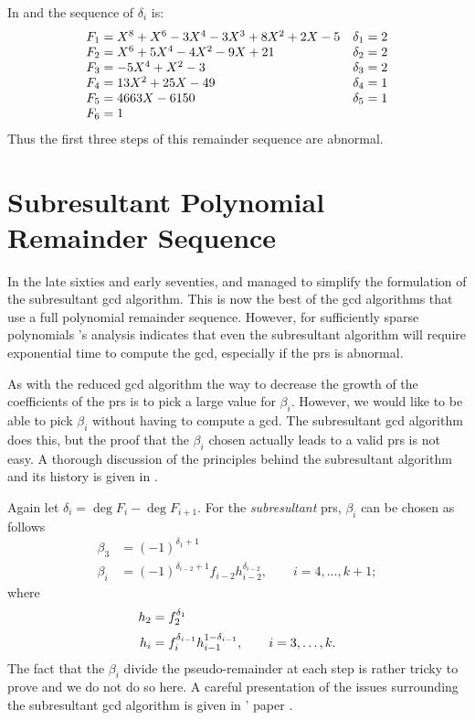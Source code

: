 In  and  the sequence of
$\delta_{i}$ is:
\[
\begin{array}[15pt]{lr}
  F_{1} = X^{8}+X^{6} -3X^{4}-3 X^{3} +8 X^{2} + 2 X -5 & \delta_{1} = 2\\
  F_{2} = X^{6}+5 X^{4} - 4 X^{2} -9 X + 21 & \delta_{2} = 2\\
  F_{3} = -5X^{4} + X^{2} - 3 & \delta_{3} = 2\\
  F_{4} = 13 X^{2} + 25 X - 49 & \delta_{4} = 1\\
  F_{5} = 4663 X - 6150 & \delta_{5} = 1 \\
  F_{6} = 1
\end{array}
\]
Thus the first three steps of this remainder sequence are abnormal.

\section{Subresultant Polynomial Remainder Sequence}
\label{Subresultant:PRS:Sec}

In the late sixties and early seventies, {\Collins} and {\BrownWS}
managed to simplify the formulation of the subresultant {\sc gcd}
algorithm.  This is now the best of the {\sc gcd} algorithms that use
a full polynomial remainder sequence.  However, for sufficiently
sparse polynomials {\BrownWS}'s analysis \cite{Brown78} indicates that
even the subresultant algorithm will require exponential time to
compute the {\sc gcd}, especially if the {\sc prs} is abnormal.

As with the reduced {\sc gcd} algorithm the way to decrease the growth
of the coefficients of the {\sc prs} is to pick a large value for
$\beta_i$.  However, we would like to be able to pick $\beta_i$
without having to compute a {\sc gcd}.  The subresultant {\sc gcd}
algorithm does this, but the proof that the $\beta_i$ chosen actually
leads to a valid {\sc prs} is not easy.  A thorough discussion of the
principles behind the subresultant algorithm and its history is given
in \cite{Loos82}.

Again let $\delta_i = \deg F_{i} - \deg F_{i+1}$.  For the {\em
subresultant} {\sc prs}, $\beta_i$ can be chosen as follows
\[
\begin{aligned}
\beta_3&= (-1)^{\delta_1+1}\\
\beta_i&= (-1)^{\delta_{i-2}+1}f_{i-2}h_{i-2}^{\delta_{i-2}}, 
\qquad i = 4,\ldots, k+1;
\end{aligned}
\]
where
\[
\begin{aligned}
h_2&=f_2^{\delta_1}\\\noalign{\vskip 2pt}
h_i&=f_i^{\delta_{i-1}}h_{i-1}^{1-\delta_{i-1}}, 
\qquad i = 3, \ldots, k.
\end{aligned}
\]
The fact that the $\beta_i$ divide the pseudo-remainder at each step
is rather tricky to prove and we do not do so here.  A careful
presentation of the issues surrounding the subresultant {\sc gcd}
algorithm is given in {\Loos}' paper \cite{Loos82}.

